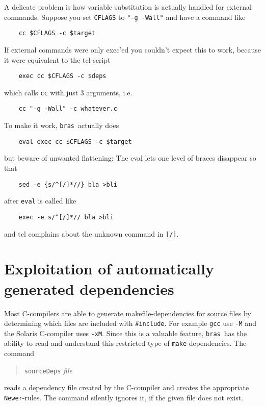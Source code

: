 \documentclass[12pt]{article}
\newcommand{\bras}{\texttt{bras}}
\newcommand{\make}{\texttt{make}}
\begin{document}
A delicate problem is how variable substitution is actually handled
for external commands. Suppose you set \texttt{CFLAGS} to 
\texttt{"-g -Wall"} and have a command like 
\begin{verbatim}
    cc $CFLAGS -c $target
\end{verbatim}
If external commands were only exec'ed you couldn't expect this to
work, because it were equivalent to the tcl-script
\begin{verbatim}
    exec cc $CFLAGS -c $deps
\end{verbatim}
which calls \texttt{cc} with just 3 arguments, i.e.\
\begin{verbatim}
    cc "-g -Wall" -c whatever.c
\end{verbatim}
To make it work, \bras\ actually does
\begin{verbatim}
    eval exec cc $CFLAGS -c $target
\end{verbatim}
but beware of unwanted flattening: The eval lets one level of braces
disappear so that
\begin{verbatim}
    sed -e {s/^[/]*//} bla >bli
\end{verbatim}
after \texttt{eval} is called like
\begin{verbatim}
    exec -e s/^[/]*// bla >bli
\end{verbatim}
and tcl complains about the unknown command in \texttt{[/]}.



\section{Exploitation of automatically generated dependencies}

Most C-compilers are able to generate makefile-dependencies for
source files by determining which files are included with
\texttt{\#include}. For example \texttt{gcc} use \texttt{-M} and the
Solaris C-compiler uses \texttt{-xM}. Since this is a valuable feature,
\bras\ has the ability to read and understand this restricted type of
\make-dependencies. The command
\begin{quote}
  \texttt{sourceDeps} \textit{file}
\end{quote}
reads a dependency file created by the C-compiler and creates the
appropriate \texttt{Newer}-rules. The command silently ignores it, if
the given file does not exist.
   
\end{document}
